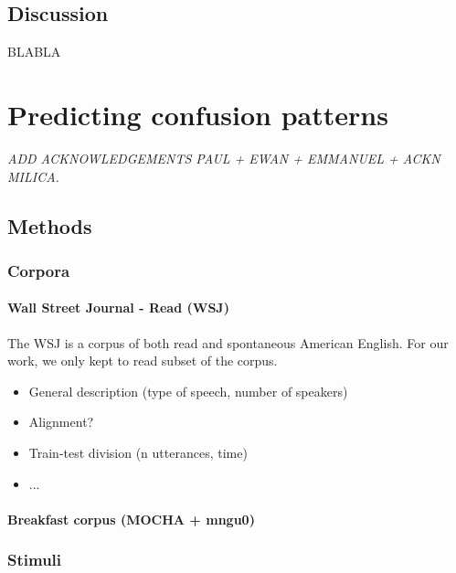 \subsection{Discussion}

BLABLA


\section{Predicting confusion patterns}
\small{\textit{{\color{red}ADD ACKNOWLEDGEMENTS PAUL + EWAN + EMMANUEL + ACKN MILICA.\\}}}

\subsection{Methods}
\subsubsection{Corpora}
\paragraph{Wall Street Journal - Read (WSJ)}
The WSJ \cite{} is a corpus of both read and spontaneous American English. For our work, we only kept to read subset of the corpus.  
\begin{itemize}
\item General description (type of speech, number of speakers)
\item Alignment?
\item Train-test division (n utterances, time)
\item ...
\end{itemize}

\paragraph{Breakfast corpus (MOCHA + mngu0)}
\subsubsection{Stimuli}

